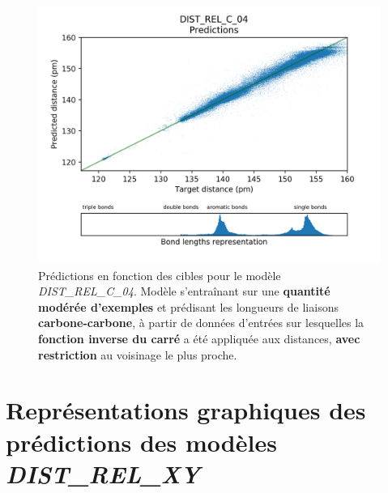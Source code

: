 \begin{figure}[!h]
	\centering
	
	\includegraphics[scale=0.75]{../figures/DIST_REL_C_04/DIST_REL_C_04_preds_targets.png}	
	
	\caption{Prédictions en fonction des cibles pour le modèle \emph{DIST\_REL\_C\_04}. Modèle s'entraînant sur une \textbf{quantité modérée d'exemples} et prédisant les longueurs de liaisons \textbf{carbone-carbone}, à partir de données d'entrées sur lesquelles la \textbf{fonction inverse du carré} a été appliquée aux distances, \textbf{avec restriction} au voisinage le plus proche.}
	
\end{figure}


\chapter{Représentations graphiques des prédictions des modèles \emph{DIST\_REL\_XY}}

\label{annexes_plot_dist_rel_xy}


